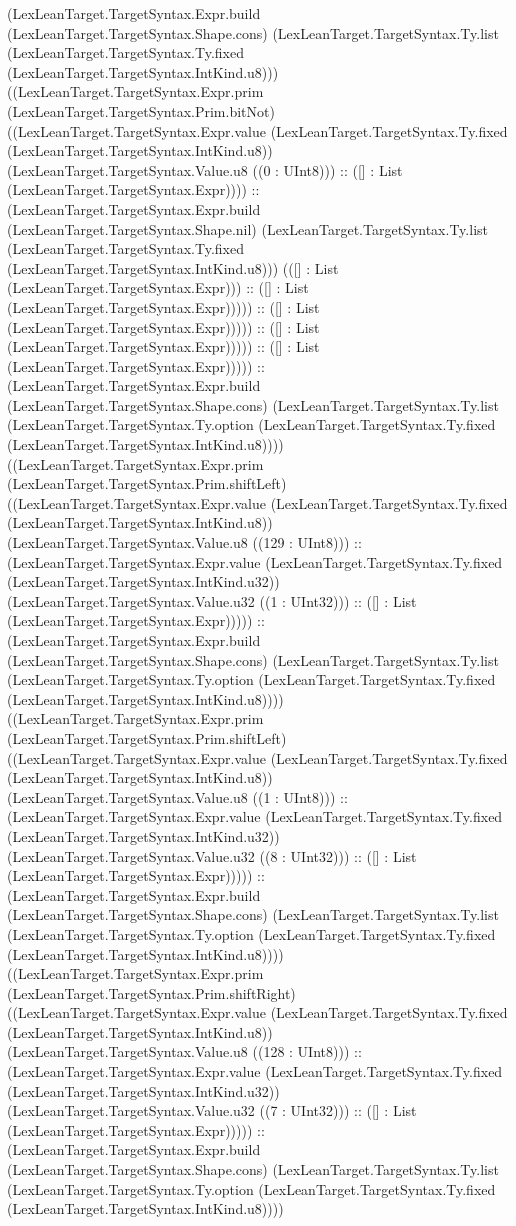 \documentclass[11pt]{article}
\begin{document}
(LexLeanTarget.TargetSyntax.Expr.build (LexLeanTarget.TargetSyntax.Shape.cons) (LexLeanTarget.TargetSyntax.Ty.list (LexLeanTarget.TargetSyntax.Ty.fixed (LexLeanTarget.TargetSyntax.IntKind.u8))) ((LexLeanTarget.TargetSyntax.Expr.prim (LexLeanTarget.TargetSyntax.Prim.bitNot) ((LexLeanTarget.TargetSyntax.Expr.value (LexLeanTarget.TargetSyntax.Ty.fixed (LexLeanTarget.TargetSyntax.IntKind.u8)) (LexLeanTarget.TargetSyntax.Value.u8 ((0 : UInt8))) :: ([] : List (LexLeanTarget.TargetSyntax.Expr)))) :: (LexLeanTarget.TargetSyntax.Expr.build (LexLeanTarget.TargetSyntax.Shape.nil) (LexLeanTarget.TargetSyntax.Ty.list (LexLeanTarget.TargetSyntax.Ty.fixed (LexLeanTarget.TargetSyntax.IntKind.u8))) (([] : List (LexLeanTarget.TargetSyntax.Expr))) :: ([] : List (LexLeanTarget.TargetSyntax.Expr))))) :: ([] : List (LexLeanTarget.TargetSyntax.Expr))))) :: ([] : List (LexLeanTarget.TargetSyntax.Expr))))) :: ([] : List (LexLeanTarget.TargetSyntax.Expr))))) :: (LexLeanTarget.TargetSyntax.Expr.build (LexLeanTarget.TargetSyntax.Shape.cons) (LexLeanTarget.TargetSyntax.Ty.list (LexLeanTarget.TargetSyntax.Ty.option (LexLeanTarget.TargetSyntax.Ty.fixed (LexLeanTarget.TargetSyntax.IntKind.u8)))) ((LexLeanTarget.TargetSyntax.Expr.prim (LexLeanTarget.TargetSyntax.Prim.shiftLeft) ((LexLeanTarget.TargetSyntax.Expr.value (LexLeanTarget.TargetSyntax.Ty.fixed (LexLeanTarget.TargetSyntax.IntKind.u8)) (LexLeanTarget.TargetSyntax.Value.u8 ((129 : UInt8))) :: (LexLeanTarget.TargetSyntax.Expr.value (LexLeanTarget.TargetSyntax.Ty.fixed (LexLeanTarget.TargetSyntax.IntKind.u32)) (LexLeanTarget.TargetSyntax.Value.u32 ((1 : UInt32))) :: ([] : List (LexLeanTarget.TargetSyntax.Expr))))) :: (LexLeanTarget.TargetSyntax.Expr.build (LexLeanTarget.TargetSyntax.Shape.cons) (LexLeanTarget.TargetSyntax.Ty.list (LexLeanTarget.TargetSyntax.Ty.option (LexLeanTarget.TargetSyntax.Ty.fixed (LexLeanTarget.TargetSyntax.IntKind.u8)))) ((LexLeanTarget.TargetSyntax.Expr.prim (LexLeanTarget.TargetSyntax.Prim.shiftLeft) ((LexLeanTarget.TargetSyntax.Expr.value (LexLeanTarget.TargetSyntax.Ty.fixed (LexLeanTarget.TargetSyntax.IntKind.u8)) (LexLeanTarget.TargetSyntax.Value.u8 ((1 : UInt8))) :: (LexLeanTarget.TargetSyntax.Expr.value (LexLeanTarget.TargetSyntax.Ty.fixed (LexLeanTarget.TargetSyntax.IntKind.u32)) (LexLeanTarget.TargetSyntax.Value.u32 ((8 : UInt32))) :: ([] : List (LexLeanTarget.TargetSyntax.Expr))))) :: (LexLeanTarget.TargetSyntax.Expr.build (LexLeanTarget.TargetSyntax.Shape.cons) (LexLeanTarget.TargetSyntax.Ty.list (LexLeanTarget.TargetSyntax.Ty.option (LexLeanTarget.TargetSyntax.Ty.fixed (LexLeanTarget.TargetSyntax.IntKind.u8)))) ((LexLeanTarget.TargetSyntax.Expr.prim (LexLeanTarget.TargetSyntax.Prim.shiftRight) ((LexLeanTarget.TargetSyntax.Expr.value (LexLeanTarget.TargetSyntax.Ty.fixed (LexLeanTarget.TargetSyntax.IntKind.u8)) (LexLeanTarget.TargetSyntax.Value.u8 ((128 : UInt8))) :: (LexLeanTarget.TargetSyntax.Expr.value (LexLeanTarget.TargetSyntax.Ty.fixed (LexLeanTarget.TargetSyntax.IntKind.u32)) (LexLeanTarget.TargetSyntax.Value.u32 ((7 : UInt32))) :: ([] : List (LexLeanTarget.TargetSyntax.Expr))))) :: (LexLeanTarget.TargetSyntax.Expr.build (LexLeanTarget.TargetSyntax.Shape.cons) (LexLeanTarget.TargetSyntax.Ty.list (LexLeanTarget.TargetSyntax.Ty.option (LexLeanTarget.TargetSyntax.Ty.fixed (LexLeanTarget.TargetSyntax.IntKind.u8)))) 
\end{document}
